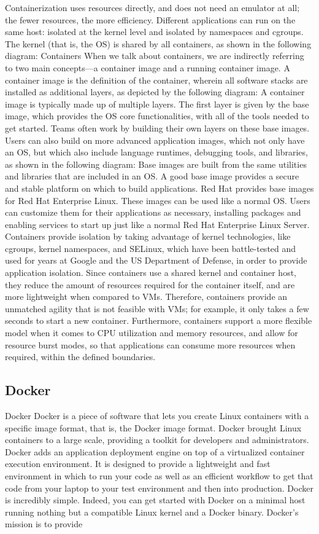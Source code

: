 Containerization uses resources directly, and does not need an emulator at all; the fewer
resources, the more efficiency. Different applications can run on the same host: isolated at
the kernel level and isolated by namespaces and cgroups. The kernel (that is, the OS) is
shared by all containers, as shown in the following diagram:
Containers
When we talk about containers, we are indirectly referring to two main concepts—a
container image and a running container image.
A container image is the definition of the container, wherein all software stacks are
installed as additional layers, as depicted by the following diagram:
A container image is typically made up of multiple layers.
The first layer is given by the base image, which provides the OS core functionalities, with
all of the tools needed to get started. Teams often work by building their own layers on
these base images. Users can also build on more advanced application images, which not
only have an OS, but which also include language runtimes, debugging tools, and libraries,
as shown in the following diagram:
Base images are built from the same utilities and libraries that are included in an OS. A
good base image provides a secure and stable platform on which to build applications. Red
Hat provides base images for Red Hat Enterprise Linux. These images can be used like a
normal OS. Users can customize them for their applications as necessary, installing
packages and enabling services to start up just like a normal Red Hat Enterprise Linux
Server.
Containers provide isolation by taking advantage of kernel technologies, like cgroups,
kernel namespaces, and SELinux, which have been battle-tested and used for years at
Google and the US Department of Defense, in order to provide application isolation.
Since containers use a shared kernel and container host, they reduce the amount of
resources required for the container itself, and are more lightweight when compared to
VMs. Therefore, containers provide an unmatched agility that is not feasible with VMs; for
example, it only takes a few seconds to start a new container. Furthermore, containers
support a more flexible model when it comes to CPU utilization and memory resources,
and allow for resource burst modes, so that applications can consume more resources when
required, within the defined boundaries.

\subsection{Docker}
Docker
Docker is a piece of software that lets you create Linux containers with a specific image
format, that is, the Docker image format.
Docker brought Linux containers to a large scale, providing a toolkit for developers and
administrators.
Docker adds an application deployment
engine on top of a virtualized container execution environment. It is
designed to provide a lightweight and fast environment in which to run your
code as well as an efficient workflow to get that code from your laptop to
your test environment and then into production. Docker is incredibly
simple. Indeed, you can get started with Docker on a minimal host running
nothing but a compatible Linux kernel and a Docker binary. Docker’s
mission is to provide
